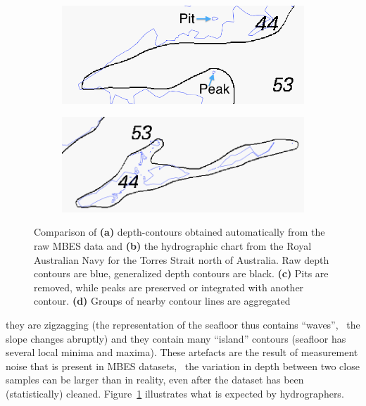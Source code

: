 \begin{figure}
\begin{subfigure}[b]{0.45\linewidth}
    \caption{}\label{fig:ideal}
  \end{subfigure}
  \begin{subfigure}[b]{0.45\linewidth}
    \centering
    \includegraphics[width=\textwidth]{figs/smoothinAndOmission.png}
    \caption{}
  \end{subfigure}
  \begin{subfigure}[b]{0.45\linewidth}
    \centering
    \includegraphics[width=\textwidth]{figs/aggregation.png}
    \caption{}
  \end{subfigure}
\caption{Comparison of \textbf{(a)} depth-contours obtained automatically from the raw MBES data and \textbf{(b)} the hydrographic chart from the Royal Australian Navy for the Torres Strait north of Australia. Raw depth contours are blue, generalized depth contours are black. \textbf{(c)} Pits are removed, while peaks are preserved or integrated with another contour. \textbf{(d)} Groups of nearby contour lines are aggregated}
\label{fig:contouringaspects}
\end{figure}
they are zigzagging (the representation of the seafloor thus contains ``waves'', \ie\ the slope changes abruptly) and they contain many ``island'' contours (seafloor has several local minima and maxima). 
These artefacts are the result of measurement noise that is present in MBES datasets, \ie\ the variation in depth between two close samples can be larger than in reality, even after the dataset has been (statistically) cleaned.
Figure~\ref{fig:ideal} illustrates what is expected by hydrographers.


